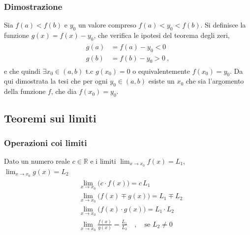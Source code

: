 \documentclass[letterpaper,10pt,italian]{jupyterBook}
\begin{document}
\subsubsection*{Dimostrazione}

\sphinxAtStartPar
Sia \(f(a) < f(b)\) e \(y_0\) un valore compreso \(f(a) < y_0 < f(b)\). Si definisce la funzione \(g(x) = f(x) - y_0\), che verifica le ipotesi del teorema degli zeri,
\begin{equation*}
\begin{split}\begin{aligned}
  g(a) & = f(a) - y_0 < 0 \\
  g(b) & = f(b) - y_0 > 0 \ ,
\end{aligned}\end{split}
\end{equation*}
\sphinxAtStartPar
e che quindi \(\exists x_0 \in (a,b)\) t.c \(g(x_0) = 0\) o equivalentemente \(f(x_0) = y_0\). Da qui dimostrata la tesi che per ogni \(y_0 \in (a,b)\) esiste un \(x_0\) che sia l’argomento della funzione \(f\), che dia \(f(x_0) = y_0\).


\subsection{Teoremi sui limiti}
\label{\detokenize{ch/infinitesimal_calculus/analysis:teoremi-sui-limiti}}\label{\detokenize{ch/infinitesimal_calculus/analysis:infinitesimal-calculus-limits-thms}}

\subsubsection{Operazioni coi limiti}
\label{\detokenize{ch/infinitesimal_calculus/analysis:operazioni-coi-limiti}}\label{\detokenize{ch/infinitesimal_calculus/analysis:infinitesimal-calculus-limits-thms-operations}}
\sphinxAtStartPar
Dato un numero reale \(c \in \mathbb{R}\) e i limiti \(\lim_{x \rightarrow x_0} f(x) = L_1\), \(\lim_{x \rightarrow x_0} g(x) = L_2\)
\begin{equation*}
\begin{split}\begin{aligned}
 & \lim_{x \rightarrow x_0} \big( c \cdot f(x) \big) = c \, L_1 \\
 & \lim_{x \rightarrow x_0} \big( f(x) \mp g(x) \big) = L_1 \mp L_2 \\
 & \lim_{x \rightarrow x_0} \big( f(x) \cdot g(x) \big) = L_1 \cdot L_2 \\
 & \lim_{x \rightarrow x_0} \frac{ f(x) }{ g(x) } = \frac{L_1}{L_2} \quad , \quad \text{se $L_2 \ne 0$}  \\
\end{aligned}\end{split}
\end{equation*}
\end{document}
